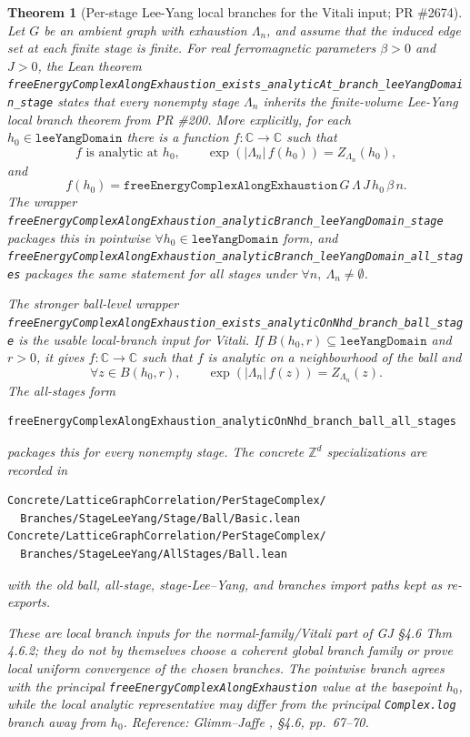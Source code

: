 \documentclass[a4paper,11pt]{article}
\newtheorem{theorem}{Theorem}
\begin{document}
\begin{theorem}[Per-stage Lee-Yang local branches for the Vitali input; PR \#2674]
Let $G$ be an ambient graph with exhaustion $\Lambda_n$, and assume
that the induced edge set at each finite stage is finite.  For real
ferromagnetic parameters $\beta>0$ and $J>0$, the Lean theorem
\texttt{freeEnergyComplexAlongExhaustion\_exists\_analyticAt\_branch\_leeYangDomain\_stage}
states that every nonempty stage $\Lambda_n$ inherits the finite-volume
Lee-Yang local branch theorem from PR \#200.  More explicitly, for each
$h_0\in\texttt{leeYangDomain}$ there is a function
$f:\mathbb C\to\mathbb C$ such that
\[
  f \text{ is analytic at } h_0,\qquad
  \exp(|\Lambda_n|\,f(h_0)) = Z_{\Lambda_n}(h_0),
\]
and
\[
  f(h_0)=
  \texttt{freeEnergyComplexAlongExhaustion}\,G\,\Lambda\,J\,h_0\,\beta\,n .
\]
The wrapper
\texttt{freeEnergyComplexAlongExhaustion\_analyticBranch\_leeYangDomain\_stage}
packages this in pointwise
$\forall h_0\in\texttt{leeYangDomain}$ form, and
\texttt{freeEnergyComplexAlongExhaustion\_analyticBranch\_leeYangDomain\_all\_stages}
packages the same statement for all stages under
$\forall n,\ \Lambda_n\ne\emptyset$.

The stronger ball-level wrapper
\texttt{freeEnergyComplexAlongExhaustion\_exists\_analyticOnNhd\_branch\_ball\_stage}
is the usable local-branch input for Vitali.  If
$B(h_0,r)\subseteq\texttt{leeYangDomain}$ and $r>0$, it gives
$f:\mathbb C\to\mathbb C$ such that $f$ is analytic on a neighbourhood
of the ball and
\[
  \forall z\in B(h_0,r),\qquad
  \exp(|\Lambda_n|\,f(z))=Z_{\Lambda_n}(z).
\]
The all-stages form
\begin{Verbatim}
freeEnergyComplexAlongExhaustion_analyticOnNhd_branch_ball_all_stages
\end{Verbatim}
packages this for every nonempty stage.  The concrete $\mathbb Z^d$
specializations are recorded in
\begin{Verbatim}[fontsize=\footnotesize]
Concrete/LatticeGraphCorrelation/PerStageComplex/
  Branches/StageLeeYang/Stage/Ball/Basic.lean
Concrete/LatticeGraphCorrelation/PerStageComplex/
  Branches/StageLeeYang/AllStages/Ball.lean
\end{Verbatim}
with the old ball, all-stage, stage-Lee--Yang, and branches import paths
kept as re-exports.

These are local branch inputs for the normal-family/Vitali part of
GJ \S 4.6 Thm 4.6.2; they do not by themselves choose a coherent
global branch family or prove local uniform convergence of the chosen
branches.  The pointwise branch agrees with the principal
\texttt{freeEnergyComplexAlongExhaustion} value at the basepoint $h_0$,
while the local analytic representative may differ from the principal
\texttt{Complex.log} branch away from $h_0$.
Reference: Glimm--Jaffe \cite{glimm-jaffe}, \S 4.6, pp.~67--70.
\end{theorem}
\end{document}
